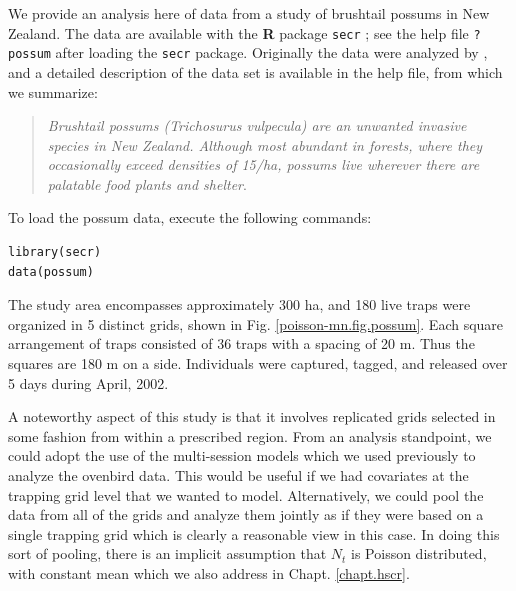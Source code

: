 We provide an analysis here of data from a study of brushtail possums
in New Zealand. The data are available with the {\bf R} package
\mbox{\tt secr} \citep{efford_etal:2009euring}; see the help file
\mbox{\tt ?possum} after loading the \mbox{\tt secr} package.
Originally the data were analyzed by \citet{efford_etal:2005}, and a
detailed description of the data set is available in the help file,
from which we summarize:
\begin{quote}
{\it Brushtail possums (Trichosurus vulpecula) are an unwanted invasive
species in New Zealand. Although most abundant in forests, where they
occasionally exceed densities of 15/ha, possums live wherever there
are palatable food plants and shelter}.
\end{quote}
To load the possum data, execute the following commands:
\begin{verbatim}
library(secr)
data(possum)
\end{verbatim}
The study area encompasses approximately 300 ha, and 180 live traps
were
organized in 5 distinct grids, shown in  Fig. \ref{poisson-mn.fig.possum}.
Each square arrangement of traps consisted of
36 traps with a spacing of 20 m. Thus the squares are 180 m on a
side.
Individuals were captured, tagged, and released over 5 days during
April, 2002. 

A noteworthy aspect of this study is that it involves replicated
grids selected in some fashion 
from within a prescribed region. 
From an analysis standpoint, we could adopt the use of the
multi-session models which we used previously to analyze the ovenbird
data. This would be useful if we had covariates at the trapping grid
level that we wanted to model.   Alternatively, we could pool the data
from all of the grids and analyze them jointly as if they were based
on a single trapping grid which is clearly a reasonable view in this case.
In doing this sort of pooling, there is
an implicit assumption that $N_{t}$ is Poisson distributed, with
constant mean \citep{royle:2004abc, royle_etal:2012arXiv} which we also
address in Chapt. \ref{chapt.hscr}.


